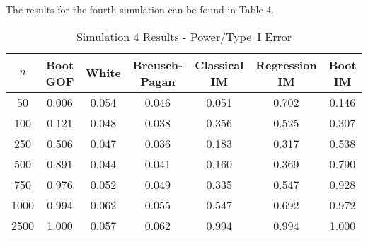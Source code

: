 \documentclass[sn-mathphys-ay]{sn-jnl}
\begin{document}
The results for the fourth simulation can be found in Table 4.


\begin{table}[h]
\caption{Simulation 4 Results - Power/Type~I Error}\label{sim4tab}%
\begin{tabular}{ c|c|c|c|c|c|c}
\toprule
$n$ & Boot GOF & White & Breusch-Pagan & Classical IM & Regression IM & Boot IM \\
\midrule
50 & 0.006 & 0.054 & 0.046 & 0.051 & 0.702 & 0.146 \\
100 & 0.121 & 0.048 & 0.038 & 0.356 & 0.525 & 0.307 \\
250 & 0.506 & 0.047 & 0.036 & 0.183 & 0.317 & 0.538 \\
500 & 0.891 & 0.044 & 0.041 & 0.160 & 0.369 & 0.790 \\
750 & 0.976 & 0.052 & 0.049 & 0.335 & 0.547 & 0.928 \\
1000 & 0.994 & 0.062 & 0.055 & 0.547 & 0.692 & 0.972 \\
2500 & 1.000 & 0.057 & 0.062 & 0.994 & 0.994 & 1.000 \\
\botrule
\end{tabular}

\end{table}
\end{document}
